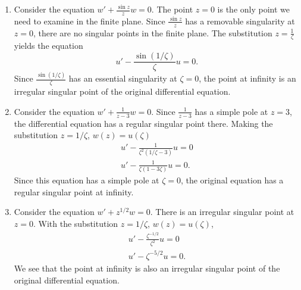{\begin{Solution}
    \begin{enumerate}
    \item Consider the equation $w' + \frac{\sin z}{z} w = 0$.  
      The point $z=0$ is the only point we need to examine in the finite plane.
      Since $\frac{\sin z}{z}$ has a removable singularity at $z=0$, there are 
      no singular points in the finite plane.
      The substitution $z = \frac{1}{\zeta}$ yields the equation
      \[ 
      u' - \frac{\sin(1/\zeta)}{\zeta}u = 0.
      \]
      Since $\frac{\sin(1/\zeta)}{\zeta}$ has an essential singularity at 
      $\zeta = 0$, the point at infinity is an irregular singular point of the 
      original differential equation.
    \item Consider the equation $w' + \frac{1}{z-3} w = 0$.
      Since $\frac{1}{z-3}$ has a simple pole at $z=3$, the differential equation
      has a regular singular point there.  Making the substitution 
      $z = 1/\zeta$, $w(z)=u(\zeta)$
      \begin{gather*}
        u' - \frac{1}{\zeta^2(1/\zeta-3)} u  = 0 \\
        u' - \frac{1}{\zeta(1-3\zeta)} u = 0.
      \end{gather*}
      Since this equation has a simple pole at $\zeta = 0$, the original equation 
      has a regular singular point at infinity.
    \item Consider the equation $w' + z^{1/2} w = 0$.
      There is an irregular singular point at $z = 0$.  With the substitution
      $z = 1/\zeta$, $w(z) = u(\zeta)$,
      \begin{gather*}
        u' - \frac{\zeta^{-1/2}}{\zeta^2} u = 0 \\
        u' - \zeta^{-5/2} u = 0.
      \end{gather*}
      We see that the point at infinity is also an irregular singular point
      of the original differential equation.
    \end{enumerate}
  \end{Solution}







}
